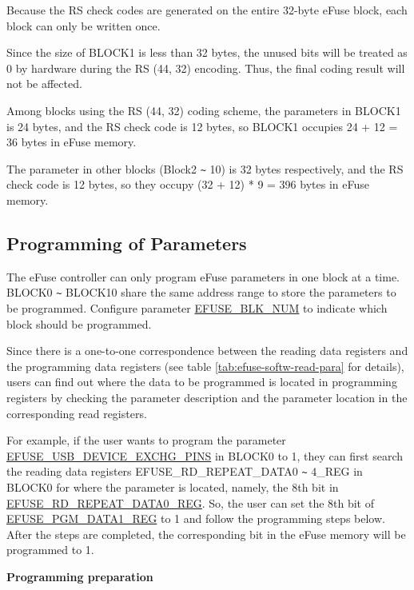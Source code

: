 \documentclass[main\_\_EN.tex]{subfiles}
\begin{document}
Because the RS check codes are generated on the entire 32-byte eFuse block, each block can only be written once.

Since the size of BLOCK1 is less than 32 bytes, the unused bits will be treated as 0 by hardware during the RS (44, 32) encoding. Thus, the final coding result will not be affected.

Among blocks using the RS (44, 32) coding scheme, the parameters in BLOCK1 is 24 bytes, and the RS check code is 12 bytes, so BLOCK1 occupies 24 + 12 = 36 bytes in eFuse memory.

The parameter in other blocks (Block2 \verb+~+ 10) is 32 bytes respectively, and the RS check code is 12 bytes, so they occupy (32 + 12) * 9 = 396 bytes in eFuse memory.

\subsection{Programming of Parameters}
\label{sec:efuse-software-programming-para}

The eFuse controller can only program eFuse parameters in one block at a time. BLOCK0 \verb+~+ BLOCK10 share the same address range to store the parameters to be programmed. Configure parameter \hyperref[fielddesc:EFUSEBLKNUM]{EFUSE\_BLK\_NUM} to indicate which block should be programmed.

Since there is a one-to-one correspondence between the reading data registers and the programming data registers (see table \ref{tab:efuse-softw-read-para} for details), users can find out where the data to be programmed is located in programming registers by checking the parameter description and the parameter location in the corresponding read registers.

For example, if the user wants to program the parameter \hyperref[fielddesc:EFUSEUSBDEVICEEXCHGPINS]{EFUSE\_USB\_DEVICE\_EXCHG\_PINS} in BLOCK0 to 1, they can first search the reading data registers EFUSE\_RD\_REPEAT\_DATA0 \verb+~+ 4\_REG in BLOCK0 for where the parameter is located, namely, the 8th bit in \hyperref[regdesc:EFUSERDREPEATDATA0REG]{EFUSE\_RD\_REPEAT\_DATA0\_REG}. So, the user can set the 8th bit of \hyperref[regdesc:EFUSEPGMDATANREG]{EFUSE\_PGM\_DATA1\_REG}
to 1 and follow the programming steps below. After the steps are completed, the corresponding bit in the eFuse memory will be programmed to 1.

{\bfseries Programming preparation}
\end{document}
